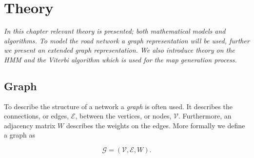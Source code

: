 \chapter{Theory}
\label{chp:theory}

\textit{In this chapter relevant theory is presented; both mathematical models and algorithms. To model the road network a graph representation will be used, further we present an extended graph representation. We also introduce theory on the HMM and the Viterbi algorithm which is used for the map generation process.}

\section{Graph}
\label{chp:theory.sec:graph}

To describe the structure of a network a \textit{graph} is often used. It describes the connections, or edges, $\mathcal{E}$, between the vertices, or nodes, $\mathcal{V}$. Furthermore, an adjacency matrix $W$ describes the weights on the edges. More formally we define a graph as

\begin{equation}
    \mathcal{G} = (\mathcal{V, E}, W). 
\end{equation}

